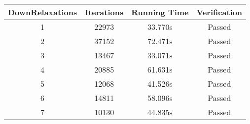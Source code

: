 \begin{tabular}{c|ccc}
\toprule
 DownRelaxations & Iterations & Running Time & Verification \\
\midrule
               1 &      22973 &      33.770s &       Passed \\
               2 &      37152 &      72.471s &       Passed \\
               3 &      13467 &      33.071s &       Passed \\
               4 &      20885 &      61.631s &       Passed \\
               5 &      12068 &      41.526s &       Passed \\
               6 &      14811 &      58.096s &       Passed \\
               7 &      10130 &      44.835s &       Passed \\
\bottomrule
\end{tabular}
